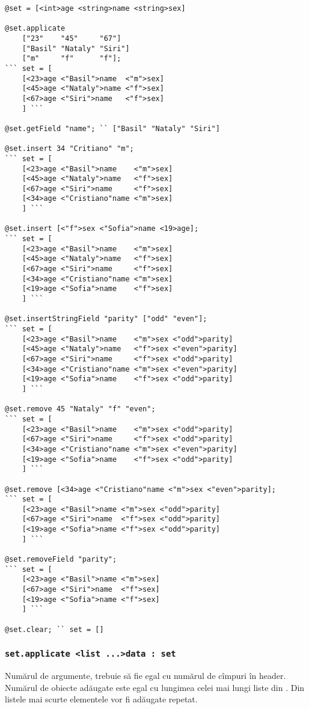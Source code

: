 \begin{lstlisting}[caption=Metodele clasei set, label=setmethods]
@set = [<int>age <string>name <string>sex]

@set.applicate 
	["23"    "45"     "67"]
	["Basil" "Nataly" "Siri"]
	["m"     "f"      "f"];
``` set = [
	[<23>age <"Basil">name  <"m">sex]
	[<45>age <"Nataly">name <"f">sex]
	[<67>age <"Siri">name   <"f">sex]
	] ```

@set.getField "name"; `` ["Basil" "Nataly" "Siri"]

@set.insert 34 "Critiano" "m";
``` set = [
	[<23>age <"Basil">name    <"m">sex]
	[<45>age <"Nataly">name   <"f">sex]
	[<67>age <"Siri">name     <"f">sex]
	[<34>age <"Cristiano"name <"m">sex]
	] ```

@set.insert [<"f">sex <"Sofia">name <19>age];
``` set = [
	[<23>age <"Basil">name    <"m">sex]
	[<45>age <"Nataly">name   <"f">sex]
	[<67>age <"Siri">name     <"f">sex]
	[<34>age <"Cristiano"name <"m">sex]
	[<19>age <"Sofia">name    <"f">sex]
	] ```

@set.insertStringField "parity" ["odd" "even"];
``` set = [
	[<23>age <"Basil">name    <"m">sex <"odd">parity]
	[<45>age <"Nataly">name   <"f">sex <"even">parity]
	[<67>age <"Siri">name     <"f">sex <"odd">parity]
	[<34>age <"Cristiano"name <"m">sex <"even">parity]
	[<19>age <"Sofia">name    <"f">sex <"odd">parity]
	] ```

@set.remove 45 "Nataly" "f" "even";
``` set = [
	[<23>age <"Basil">name    <"m">sex <"odd">parity]
	[<67>age <"Siri">name     <"f">sex <"odd">parity]
	[<34>age <"Cristiano"name <"m">sex <"even">parity]
	[<19>age <"Sofia">name    <"f">sex <"odd">parity]
	] ```

@set.remove [<34>age <"Cristiano"name <"m">sex <"even">parity];
``` set = [
	[<23>age <"Basil">name <"m">sex <"odd">parity]
	[<67>age <"Siri">name  <"f">sex <"odd">parity]
	[<19>age <"Sofia">name <"f">sex <"odd">parity]
	] ```

@set.removeField "parity";
``` set = [
	[<23>age <"Basil">name <"m">sex]
	[<67>age <"Siri">name  <"f">sex]
	[<19>age <"Sofia">name <"f">sex]
	] ```

@set.clear; `` set = []
\end{lstlisting}

\subsubsection{\lstinline|set.applicate <list ...>data : set|}

Numărul de argumente, trebuie să fie egal cu numărul de cîmpuri în header. Numărul de obiecte adăugate este egal cu lungimea celei mai lungi liste din . Din listele mai scurte elementele vor fi adăugate repetat.

